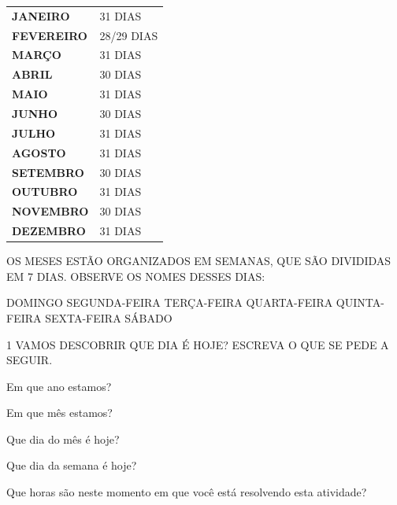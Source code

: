 {\begin{center}
\begin{tabular}{ll}
\textbf{JANEIRO} & 31 DIAS \\
\textbf{FEVEREIRO} & 28/29 DIAS \\
\textbf{MARÇO} & 31 DIAS \\
\textbf{ABRIL} & 30 DIAS \\
\textbf{MAIO} & 31 DIAS \\
\textbf{JUNHO} &30 DIAS\\
\textbf{JULHO} & 31 DIAS \\
\textbf{AGOSTO} & 31 DIAS \\
\textbf{SETEMBRO} & 30 DIAS \\
\textbf{OUTUBRO} & 31 DIAS \\
\textbf{NOVEMBRO} & 30 DIAS \\
\textbf{DEZEMBRO} & 31 DIAS\\
\end{tabular}
\end{center}

OS MESES ESTÃO ORGANIZADOS EM SEMANAS, QUE SÃO DIVIDIDAS EM 7 DIAS. OBSERVE OS NOMES
DESSES DIAS:

\begin{mdframed}[linewidth=2pt,linecolor=salmao,roundcorner=10pt]
DOMINGO \hfill SEGUNDA-FEIRA \hfill TERÇA-FEIRA \hfill QUARTA-FEIRA \hfill QUINTA-FEIRA \hfill SEXTA-FEIRA \hfill
SÁBADO
\end{mdframed}
}

\pagebreak
{}

\num{1} VAMOS DESCOBRIR QUE DIA É HOJE? ESCREVA O QUE SE PEDE A SEGUIR.

\begin{escolha}
\item Em que ano estamos? \reduline{\mbox{}\hfill}

\item Em que mês estamos? \reduline{\mbox{}\hfill}

\item Que dia do mês é hoje? \reduline{\mbox{}\hfill}

\item Que dia da semana é hoje? \reduline{\mbox{}\hfill}

\item Que horas são neste momento em que você está resolvendo esta atividade? \reduline{\mbox{}\hfill}
\end{escolha}



